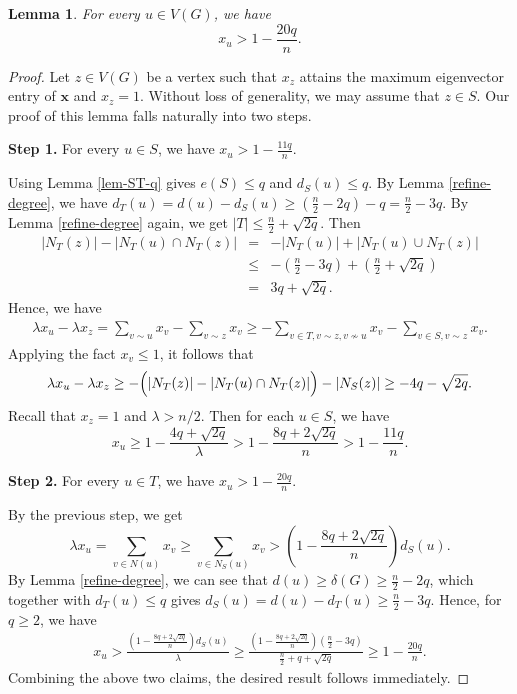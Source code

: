 \documentclass[10pt,a4paper]{amsart}
\newtheorem{lemma}{Lemma}
\begin{document}
\begin{lemma} \label{eigen-entry}
For every $u\in V(G)$, we have 
\[  {x}_u > 1- \frac{20q}{n}. \]  
\end{lemma}

\begin{proof} 
Let $z\in V(G)$ be a vertex 
such that ${x}_z$ attains the maximum 
eigenvector entry of $\bm{x}$ and ${x}_z=1$. 
Without loss of generality, we may assume that $z\in S$.  
Our proof of this lemma falls naturally into two steps.  
\medskip 

{\bf Step 1.}   For every $u \in S$, 
we have ${x}_u > 1- \frac{11q}{n}$. 

\medskip 

 Using Lemma \ref{lem-ST-q} gives $e(S)\le q$ and  $d_S(u)\le q $. By Lemma \ref{refine-degree},  we have  
$d_T(u) = d(u)-d_S(u)  \ge ( \frac{n}{2}-2q )-q  = \frac{n}{2}-3q$. 
By Lemma \ref{refine-degree} again, we  get 
$|T|\le \frac{n}{2} + \sqrt{2q}$. Then 
\begin{eqnarray*}
 |N_T(z)| - |N_T(u)\cap N_T(z)|  
 &=& -|N_T(u)| + |N_T(u) \cup N_T(z)|  \\
& \le& - \left(\frac{n}{2} -3q \right) +  
\left(\frac{n}{2}  + \sqrt{2q} \right) \\
&=& 3q + \sqrt{2q} .
\end{eqnarray*}  
Hence, we have 
\begin{eqnarray*}
\lambda {x}_u-\lambda {x}_z 
= \sum_{v\sim u} {x}_v  - \sum_{v\sim z} {x}_v 
\ge  -\sum_{v\in T, v\sim z, v\not\sim u} {x}_v 
-\sum_{v\in S, v\sim z} {x}_v. 
\end{eqnarray*}
Applying the fact ${x}_v \le 1$, it follows that 
\begin{eqnarray*}
\lambda {x}_u-\lambda {x}_z  
\ge  -\Bigl( |N_T(z)| -|N_T(u)\cap N_T(z)| \Bigr) 
- |N_S(z)| 
\ge  - 4q -\sqrt{2q}. 
\end{eqnarray*}
Recall that ${x}_z=1$ 
and $\lambda > {n}/{2}$. Then for each $u\in S$, 
we have 
\begin{equation*}\label{verct1}
{x}_u\ge 1-\frac{4q + \sqrt{2q} }{\lambda }> 1-\frac{8q + 2\sqrt{2q} }{n} > 1-\frac{11q}{n}.
\end{equation*}

{\bf Step 2.}   
For every $u\in T$, we have ${x}_u> 1- \frac{20q}{n}$. 

\medskip 

By the previous step, we get 
 $$\lambda  {x}_u=\sum_{v\in N(u)} {x}_v\ge \sum_{v\in  N_S(u)} {x}_v 
 > \left(1-\frac{8q + 2\sqrt{2q} }{n} \right)d_S(u).$$ 
By  Lemma \ref{refine-degree}, we can see that 
$d(u)\ge \delta (G)\ge \frac{n}{2} - 2q$, 
which together with $d_T(u)\le q$ gives 
$ d_S(u)=d(u)- d_T(u)\ge  \frac{n}{2}-3q$.
 Hence, for $q\ge 2$, we have 
 \begin{eqnarray*}
 {x}_u >  \frac{(1-\frac{8q + 2\sqrt{2q} }{n})d_S(u)}{\lambda } 
 \ge  \frac{(1-\frac{8q + 2\sqrt{2q} }{n})(\frac{n}{2}-3q)}{
 \frac{n}{2}+q + \sqrt{2q}} 
 \ge 1- \frac{20q}{n}.
 \end{eqnarray*} 
Combining the above two claims, 
 the desired result follows immediately.
\end{proof}
\end{document}
